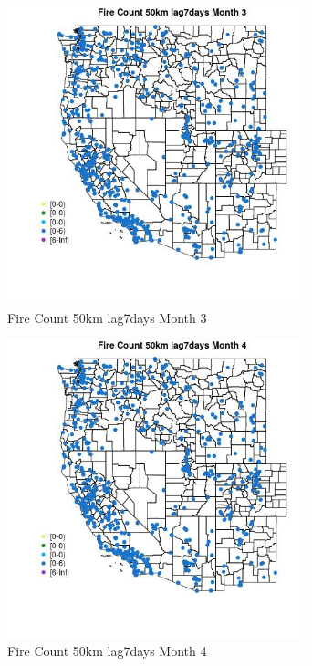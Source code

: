 \begin{figure} 
\centering  
\includegraphics[width=0.77\textwidth]{Code_Outputs/Report_ML_input_PM25_Step4_part_e_de_duplicated_aves_compiled_2019-05-21wNAs_MapObsMo3Fire_Count_50km_lag7days.jpg} 
\caption{\label{fig:Report_ML_input_PM25_Step4_part_e_de_duplicated_aves_compiled_2019-05-21wNAsMapObsMo3Fire_Count_50km_lag7days}Fire Count 50km lag7days Month 3} 
\end{figure} 
 

\begin{figure} 
\centering  
\includegraphics[width=0.77\textwidth]{Code_Outputs/Report_ML_input_PM25_Step4_part_e_de_duplicated_aves_compiled_2019-05-21wNAs_MapObsMo4Fire_Count_50km_lag7days.jpg} 
\caption{\label{fig:Report_ML_input_PM25_Step4_part_e_de_duplicated_aves_compiled_2019-05-21wNAsMapObsMo4Fire_Count_50km_lag7days}Fire Count 50km lag7days Month 4} 
\end{figure} 
 

